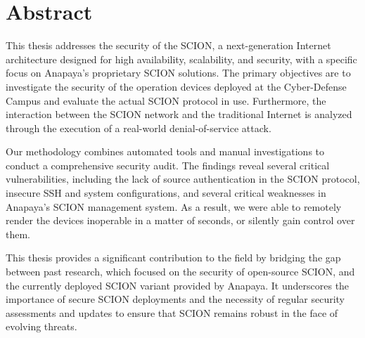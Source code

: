 \chapter*{Abstract}





This thesis addresses the security of the SCION, a next-generation Internet architecture designed for high availability, scalability, and security, with a specific focus on Anapaya's proprietary SCION solutions.
The primary objectives are to investigate the security of the operation devices deployed at the Cyber-Defense Campus and evaluate the actual SCION protocol in use.
Furthermore, the interaction between the SCION network and the traditional Internet is analyzed through the execution of a real-world denial-of-service attack.

Our methodology combines automated tools and manual investigations to conduct a comprehensive security audit.
The findings reveal several critical vulnerabilities, including the lack of source authentication in the SCION protocol, insecure SSH and system configurations, and several critical weaknesses in Anapaya's SCION management system.
As a result, we were able to remotely render the devices inoperable in a matter of seconds, or silently gain control over them.

This thesis provides a significant contribution to the field by bridging the gap between past research, which focused on the security of open-source SCION, and the currently deployed SCION variant provided by Anapaya.
It underscores the importance of secure SCION deployments and the necessity of regular security assessments and updates to ensure that SCION remains robust in the face of evolving threats.